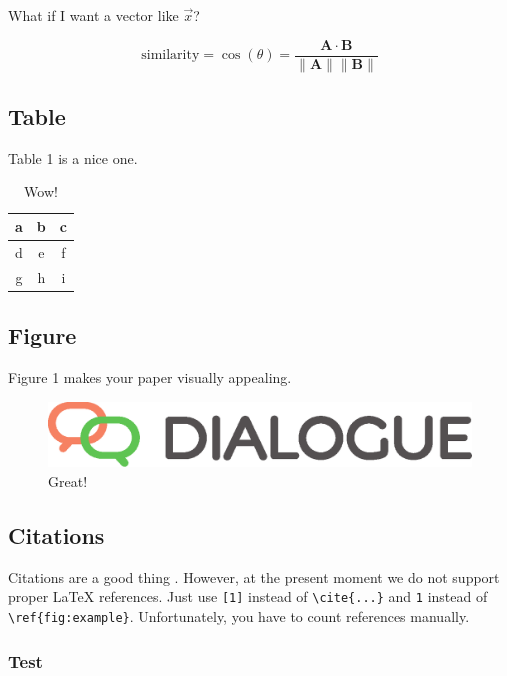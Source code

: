 \documentclass{dialogue}
\begin{document}
What if I want a vector like $\vec{x}$?

\begin{equation}
  \text{similarity} = \cos(\theta) = \frac{\mathbf{A} \cdot \mathbf{B}}{\|\mathbf{A}\| \|\mathbf{B}\|}
\end{equation}

\subsection{Table}

Table 1 is a nice one.

\begin{table}[htbp]
\centering
\caption{Wow!}
\begin{tabular}{|c|c|c|}\hline
a & b & c \\\hline
d & e & f \\\hline
g & h & i \\\hline
\end{tabular}
\end{table}

\subsection{Figure}

Figure 1 makes your paper visually appealing.

\begin{figure}[htbp]
\centering
\includegraphics[scale=.4]{dialogue.eps}
\caption{Great!}
\end{figure}

\subsection{Citations}

Citations are a good thing \cite{Panchenko:18:dialogue}. However, at the present moment we do not support proper {\LaTeX} references. Just use \verb|[1]| instead of \verb|\cite{...}| and \verb|1| instead of \verb|\ref{fig:example}|. Unfortunately, you have to count references manually.

\subsubsection{Test}
\end{document}
